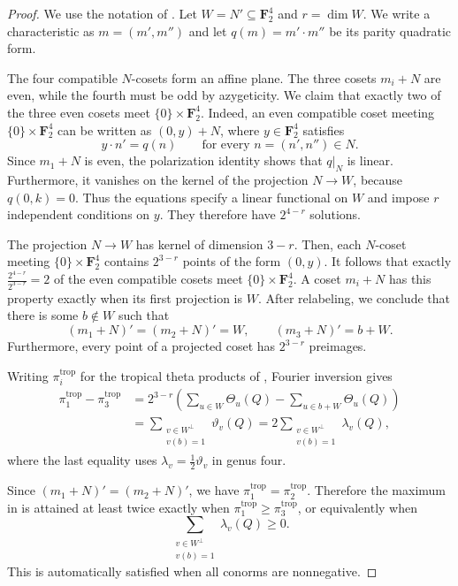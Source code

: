 \documentclass[11pt,letterpaper]{amsart}
\begin{document}
\begin{proof}
We use the notation of \cite[\S4]{chua2019schottky}. Let $W=N'\subseteq\mathbf F_2^4$ and $r=\dim W$. We write a characteristic as $m=(m',m'')$ and let $q(m)=m'\cdot m''$ be its parity quadratic form.

The four compatible $N$-cosets form an affine plane. The three cosets $m_i+N$ are even, while the fourth must be odd by azygeticity. We claim that exactly two of the three even cosets meet $\{0\}\times\mathbf F_2^4$. Indeed, an even compatible coset meeting $\{0\}\times\mathbf F_2^4$ can be written as $(0,y)+N$, where $y\in\mathbf F_2^4$ satisfies
\[
    y\cdot n'=q(n)\qquad\text{for every }n=(n',n'')\in N.
\]
Since $m_1+N$ is even, the polarization identity shows that $q|_N$ is linear. Furthermore, it vanishes on the kernel of the projection $N\to W$, because $q(0,k)=0$. Thus the equations specify a linear functional on $W$ and impose $r$ independent conditions on $y$. They therefore have $2^{4-r}$ solutions.

The projection $N\to W$ has kernel of dimension $3-r$. Then, each $N$-coset meeting $\{0\}\times\mathbf F_2^4$ contains $2^{3-r}$ points of the form $(0,y)$. It follows that exactly $\frac{2^{4-r}}{2^{3-r}}=2$ of the even compatible cosets meet $\{0\}\times\mathbf F_2^4$. A coset $m_i+N$ has this property exactly when its first projection is $W$. After relabeling, we conclude that there is some $b\notin W$ such that
\[
    (m_1+N)'=(m_2+N)'=W,\qquad (m_3+N)'=b+W.
\]
Furthermore, every point of a projected coset has $2^{3-r}$ preimages.

Writing $\pi_i^{\mathrm{trop}}$ for the tropical theta products of \cite[(23)]{chua2019schottky}, Fourier inversion gives
\[
\begin{aligned}
    \pi_1^{\mathrm{trop}}-\pi_3^{\mathrm{trop}}
      &=2^{3-r}\left(\sum_{u\in W}\Theta_u(Q)-\sum_{u\in b+W}\Theta_u(Q)\right)\\
      &=\sum_{\substack{v\in W^\perp\\v(b)=1}}\vartheta_v(Q)
       =2\sum_{\substack{v\in W^\perp\\v(b)=1}}\lambda_v(Q),
\end{aligned}
\]
where the last equality uses $\lambda_v=\frac12\vartheta_v$ in genus four.

Since $(m_1+N)'=(m_2+N)'$, we have $\pi_1^{\mathrm{trop}}=\pi_2^{\mathrm{trop}}$. Therefore the maximum in \cite[(23)]{chua2019schottky} is attained at least twice exactly when $\pi_1^{\mathrm{trop}}\geq\pi_3^{\mathrm{trop}}$, or equivalently when
\[
    \sum_{\substack{v\in W^\perp\\v(b)=1}}\lambda_v(Q)\geq0.
\]
This is automatically satisfied when all conorms are nonnegative.
\end{proof}
\end{document}

